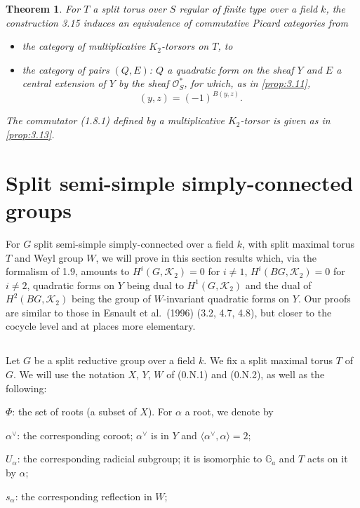 \documentclass[11pt,a4paper]{article}
\theoremstyle{plain}
\newtheorem{theorem}{Theorem}[section]
\theoremstyle{definition}
\newcommand{\cK}{\mathcal{K}}
\newcommand{\cO}{\mathcal{O}}
\newcommand{\bG}{\mathbb{G}}
\begin{document}
\begin{theorem}\label{thm:3.16}
For $T$ a split torus over $S$ regular of finite type over a field $k$, the construction 3.15 induces an equivalence of commutative Picard categories from
\begin{itemize}
\item[(i)] the category of multiplicative $K_2$-torsors on $T$, to
\item[(ii)] the category of pairs $(Q, E)$: $Q$ a quadratic form on the sheaf $Y$ and $E$ a central extension of $Y$ by the sheaf $\cO^*_S$, for which, as in \ref{prop:3.11},
\[(y, z) = (-1)^{B(y,z)}.\]
\end{itemize}
The commutator \textup{(1.8.1)} defined by a multiplicative $K_2$-torsor is given as in \ref{prop:3.13}.
\end{theorem}

\section{Split semi-simple simply-connected groups}

For $G$ split semi-simple simply-connected over a field $k$, with split maximal torus $T$ and Weyl group $W$, we will prove in this section results which, via the formalism of 1.9, amounts to $H^i(G, \cK_2) = 0$ for $i \neq 1$, $H^i(BG, \cK_2) = 0$ for $i \neq 2$, quadratic forms on $Y$ being dual to $H^1(G, \cK_2)$ and the dual of $H^2(BG, \cK_2)$ being the group of $W$-invariant quadratic forms on $Y$. Our proofs are similar to those in Esnault et al.~(1996) (3.2, 4.7, 4.8), but closer to the cocycle level and at places more elementary.

\subsection{}
Let $G$ be a split reductive group over a field $k$. We fix a split maximal torus $T$ of $G$. We will use the notation $X$, $Y$, $W$ of (0.N.1) and (0.N.2), as well as the following:

$\Phi$: the set of roots (a subset of $X$). For $\alpha$ a root, we denote by

$\alpha^\vee$: the corresponding coroot; $\alpha^\vee$ is in $Y$ and $\langle \alpha^\vee, \alpha \rangle = 2$;

$U_\alpha$: the corresponding radicial subgroup; it is isomorphic to $\bG_a$ and $T$ acts on it by $\alpha$;

$s_\alpha$: the corresponding reflection in $W$;
\end{document}
